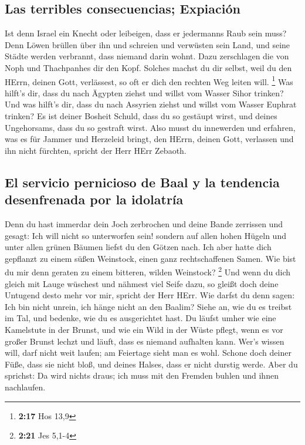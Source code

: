 \hypertarget{las-terribles-consecuencias-expiaciuxf3n}{%
\subsection{Las terribles consecuencias;
Expiación}\label{las-terribles-consecuencias-expiaciuxf3n}}

 Ist denn Israel ein Knecht oder leibeigen, dass er
jedermanns Raub sein muss?  Denn Löwen brüllen über ihn
und schreien und verwüsten sein Land, und seine Städte werden verbrannt,
dass niemand darin wohnt.  Dazu zerschlagen die von Noph
und Thachpanhes dir den Kopf.  Solches machst du dir
selbst, weil du den HErrn, deinen Gott, verlässest, so oft er dich den
rechten Weg leiten will. \footnote{\textbf{2:17} Hos 13,9}
 Was hilft's dir, dass du nach Ägypten ziehst und willst
vom Wasser Sihor trinken? Und was hilft's dir, dass du nach Assyrien
ziehst und willst vom Wasser Euphrat trinken?  Es ist
deiner Bosheit Schuld, dass du so gestäupt wirst, und deines
Ungehorsams, dass du so gestraft wirst. Also musst du innewerden und
erfahren, was es für Jammer und Herzeleid bringt, den HErrn, deinen
Gott, verlassen und ihn nicht fürchten, spricht der Herr HErr Zebaoth.

\hypertarget{el-servicio-pernicioso-de-baal-y-la-tendencia-desenfrenada-por-la-idolatruxeda}{%
\subsection{El servicio pernicioso de Baal y la tendencia desenfrenada
por la
idolatría}\label{el-servicio-pernicioso-de-baal-y-la-tendencia-desenfrenada-por-la-idolatruxeda}}

 Denn du hast immerdar dein Joch zerbrochen und deine
Bande zerrissen und gesagt: Ich will nicht so unterworfen sein! sondern
auf allen hohen Hügeln und unter allen grünen Bäumen liefst du den
Götzen nach.  Ich aber hatte dich gepflanzt zu einem
süßen Weinstock, einen ganz rechtschaffenen Samen. Wie bist du mir denn
geraten zu einem bitteren, wilden Weinstock? \footnote{\textbf{2:21} Jes
  5,1-4}  Und wenn du dich gleich mit Lauge wüschest und
nähmest viel Seife dazu, so gleißt doch deine Untugend desto mehr vor
mir, spricht der Herr HErr.  Wie darfst du denn sagen:
Ich bin nicht unrein, ich hänge nicht an den Baalim? Siehe an, wie du es
treibst im Tal, und bedenke, wie du es ausgerichtet hast.
 Du läufst umher wie eine Kamelstute in der Brunst, und
wie ein Wild in der Wüste pflegt, wenn es vor großer Brunst lechzt und
läuft, dass es niemand aufhalten kann. Wer's wissen will, darf nicht
weit laufen; am Feiertage sieht man es wohl.  Schone doch
deiner Füße, dass sie nicht bloß, und deines Halses, dass er nicht
durstig werde. Aber du sprichst: Da wird nichts draus; ich muss mit den
Fremden buhlen und ihnen nachlaufen.

